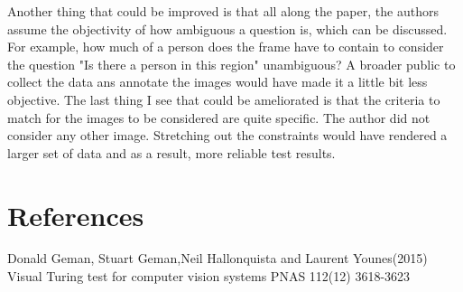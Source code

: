 \documentclass[10pt,a4paper]{scrartcl}
\begin{document}
Another thing that could be improved is that all along the paper, the authors assume the objectivity of how ambiguous a question is, which can be discussed. For example, how much of a person does the frame have to contain to consider the question "Is there a person in this region" unambiguous? A broader public to collect the data ans annotate the images would have made it a little bit less objective. 
The last thing I see that could be ameliorated is that the criteria to match for the images to be considered are quite specific. The author did not consider any other image. Stretching out the constraints would have rendered a larger set of data and as a result, more reliable test results.

\section {References}
Donald Geman, Stuart Geman,Neil Hallonquista and Laurent Younes(2015) Visual  
Turing test for computer vision systems PNAS 112(12) 3618-3623
\end{document}
